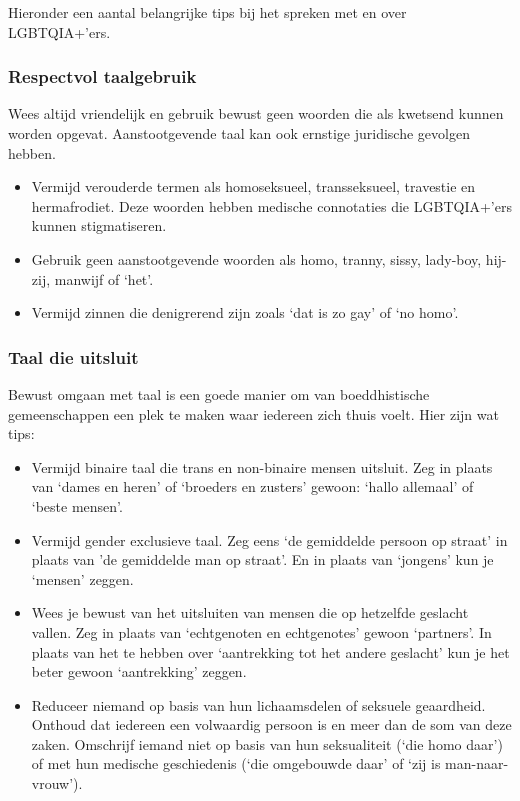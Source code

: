 \documentclass[12pt,openany]{book}
\begin{document}
Hieronder een aantal belangrijke tips bij het spreken met en over LGBTQIA+’ers.

\subsubsection*{Respectvol taalgebruik}

Wees altijd vriendelijk en gebruik bewust geen woorden die als kwetsend kunnen worden opgevat. Aanstootgevende taal kan ook ernstige juridische gevolgen hebben.

\begin{itemize}
  \setlength\itemsep{-0.3em}
  \item Vermijd verouderde termen als homoseksueel, transseksueel, travestie en hermafrodiet. Deze woorden hebben medische connotaties die LGBTQIA+’ers kunnen stigmatiseren.
  \item Gebruik geen aanstootgevende woorden als homo, tranny, sissy, lady-boy, hij-zij, manwijf of ‘het’.
  \item Vermijd zinnen die denigrerend zijn zoals ‘dat is zo gay’ of ‘no homo’.
\end{itemize}

\subsubsection*{Taal die uitsluit}

Bewust omgaan met taal is een goede manier om van boeddhistische gemeenschappen een plek te maken waar iedereen zich thuis voelt.  Hier zijn wat tips:

\begin{itemize}
  \setlength\itemsep{-0.3em}
  \item Vermijd binaire taal die trans en non-binaire mensen uitsluit. Zeg in plaats van ‘dames en heren’ of ‘broeders en zusters’ gewoon: ‘hallo allemaal’ of ‘beste mensen’.
  \item Vermijd gender exclusieve taal. Zeg eens ‘de gemiddelde persoon op straat’ in plaats van ’de gemiddelde man op straat’. En in plaats van ‘jongens’ kun je ‘mensen’ zeggen.
  \item Wees je bewust van het uitsluiten van mensen die op hetzelfde geslacht vallen. Zeg in plaats van ‘echtgenoten en echtgenotes’ gewoon ‘partners’. In plaats van het te hebben over ‘aantrekking tot het andere geslacht’ kun je het beter gewoon ‘aantrekking’ zeggen.
\item Reduceer niemand op basis van hun lichaamsdelen of seksuele geaardheid. Onthoud dat iedereen een volwaardig persoon is en meer dan de som van deze zaken. Omschrijf iemand niet op basis van hun seksualiteit (‘die homo daar’) of met hun medische geschiedenis (‘die omgebouwde daar’ of ‘zij is man-naar-vrouw’).
\end{itemize}
\end{document}
